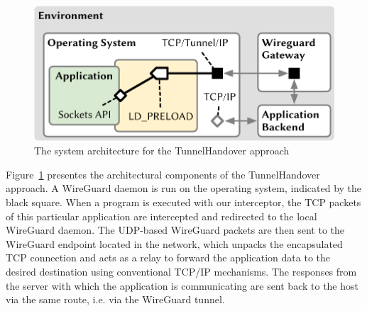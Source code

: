 \begin{figure}
    \centering
    \includegraphics[width=.9\linewidth]{figures/model_TunnelHandover.pdf}
    \caption{The system architecture for the TunnelHandover approach}
    \label{fig:model_TunnelHandover}
\end{figure}
Figure\ \ref{fig:model_TunnelHandover} presentes the architectural components of the TunnelHandover approach. 
A WireGuard daemon is run on the operating system, indicated by the black square.
When a program is executed with our interceptor, the TCP packets of this particular application are intercepted and redirected to the local WireGuard daemon.
The UDP-based WireGuard packets are then sent to the WireGuard endpoint located in the network, which unpacks the encapsulated TCP connection and acts as a relay to forward the application data to the desired destination using conventional TCP/IP mechanisms.
The responses from the server with which the application is communicating are sent back to the host via the same route, i.e. via the WireGuard tunnel.

